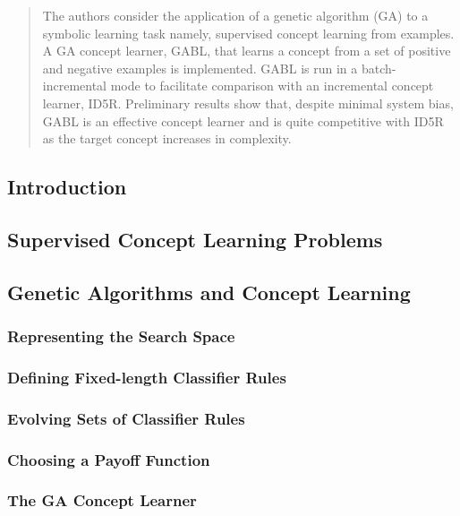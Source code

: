 \documentclass[../main.tex]{subfiles}
\begin{document}
\begin{mdframed}
\end{mdframed}

\begin{abstract}
The authors consider the application of a genetic algorithm (GA) to a symbolic learning task namely, supervised concept
learning from examples. A GA concept learner, GABL, that learns a concept from a set of positive and negative examples
is implemented. GABL is run in a batch-incremental mode to facilitate comparison with an incremental concept learner,
ID5R. Preliminary results show that, despite minimal system bias, GABL is an effective concept learner and is quite
competitive with ID5R as the target concept increases in complexity.
\end{abstract}

\subsection{Introduction}

\subsection{Supervised Concept Learning Problems}

\subsection{Genetic Algorithms and Concept Learning}

\subsubsection{Representing the Search Space}

\subsubsection{Defining Fixed-length Classifier Rules}

\subsubsection{Evolving Sets of Classifier Rules}

\subsubsection{Choosing a Payoff Function}

\subsubsection{The GA Concept Learner}
\end{document}
